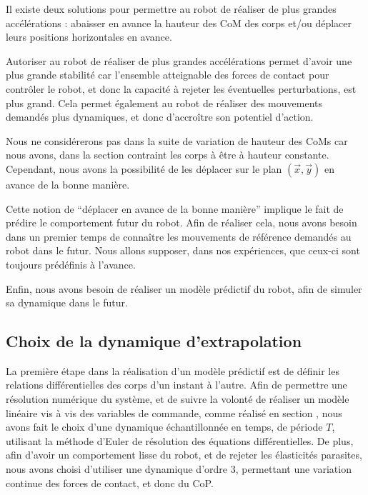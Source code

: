 			Il existe deux solutions pour permettre au robot de réaliser de plus grandes accélérations : 
			abaisser en avance la hauteur des CoM des corps et/ou déplacer leurs positions horizontales en avance. 
			
			Autoriser au robot de réaliser de plus grandes accélérations permet d'avoir une plus grande stabilité car l'ensemble atteignable des forces de contact pour contrôler le robot, et donc la capacité à rejeter les éventuelles perturbations, est plus grand.
			Cela permet également au robot de réaliser des mouvements demandés plus dynamiques, et donc d’accroître son potentiel d'action.
			
			Nous ne considérerons pas dans la suite de variation de hauteur des CoMs car nous avons, dans la section  contraint les corps à être à hauteur constante.
			Cependant, nous avons la possibilité de les déplacer sur le plan $(\vec{x}, \vec{y})$ en avance de la bonne manière.
			
			Cette notion de ``déplacer en avance de la bonne manière'' implique le fait de prédire le comportement futur du robot.
			Afin de réaliser cela, nous avons besoin dans un premier temps de connaître les mouvements de référence demandés au robot dans le futur.
			Nous allons supposer, dans nos expériences, que ceux-ci sont toujours prédéfinis à l'avance.
			
			Enfin, nous avons besoin de réaliser un modèle prédictif du robot, afin de simuler sa dynamique dans le futur.

		\subsection{Choix de la dynamique d'extrapolation}

			La première étape dans la réalisation d'un modèle prédictif est de définir les relations différentielles des corps d'un instant à l'autre.
			Afin de permettre une résolution numérique du système, et de suivre la volonté de réaliser un modèle linéaire vis à vis des variables de commande, comme réalisé en section , 
			nous avons fait le choix d'une dynamique échantillonnée en temps, de période $T$, utilisant la méthode d'Euler de résolution des équations différentielles.
			De plus, afin d'avoir un comportement lisse du robot, et de rejeter les élasticités parasites, nous avons choisi d'utiliser une dynamique d'ordre 3, permettant une variation continue des forces de contact, et donc du CoP.
			
